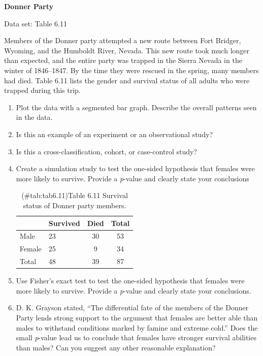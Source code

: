 \documentclass[
]{report}
\begin{document}
\begin{list}{E.}{ \setlength{\itemsep}{0.5em}}
  \item \textbf{Donner Party}    

  Data set: Table 6.11    

  Members of the Donner party attempted a new route between Fort Bridger, Wyoming, and the Humboldt River, Nevada. This new route took much longer than expected, and the entire party was trapped in the Sierra Nevada in the winter of 1846–1847. By the time they were rescued in the spring, many members had died. Table 6.11 lists the gender and survival status of all adults who were trapped during this trip.  
  \begin{enumerate}
    \item Plot the data with a segmented bar graph. Describe the overall patterns seen in the data.
    \item Is this an example of an experiment or an observational study?
    \item Is this a cross-classification, cohort, or case-control study?
    \item Create a simulation study to test the one-sided hypothesis that females were more likely to survive. Provide a \textit{p}-value and clearly state your conclusions
\begin{table}[!h]
\centering
\caption{(\#tab:tab6.11)Table 6.11 Survival status of Donner party members.}
\centering
\begin{tabular}[t]{llcc}
\toprule
  & Survived & Died & Total\\
\midrule
Male & 23 & 30 & 53\\
Female & 25 & 9 & 34\\
Total & 48 & 39 & 87\\
\bottomrule
\end{tabular}
\end{table}


    \item Use Fisher’s exact test to test the one-sided hypothesis that females were more likely to survive. Provide a \textit{p}-value and clearly state your conclusions.
    \item D. K. Grayson stated, “The differential fate of the members of the Donner Party lends strong support to the argument that females are better able than males to withstand conditions marked by famine and extreme cold.” Does the small \textit{p}-value lead us to conclude that females have stronger survival abilities than males? Can you suggest any other reasonable explanation?
  \end{enumerate}


\end{list}
\end{document}
